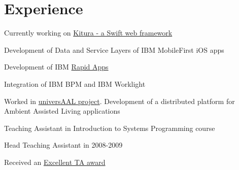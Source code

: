 \documentclass[]{deedy-resume}
\begin{document}
\hfill
\begin{minipage}[t]{0.66\textwidth}


\section{Experience}

\vspace{\topsep} %
\begin{tightemize}
\item Currently working on \href{https://github.com/IBM-Swift/Kitura}{Kitura - a Swift web framework}
\item Development of Data and Service Layers of IBM MobileFirst iOS apps
\item Development of IBM \href{https://www.youtube.com/watch?v=wKHfEx988mc}{Rapid Apps}
\item Integration of IBM BPM and IBM Worklight
\end{tightemize}
\sectionsep

\vspace{\topsep} %
\begin{tightemize}
\item Worked in \href{http://universaal.sintef9013.com/index.php/en/}{universAAL project}. Development of a distributed platform for Ambient Assisted Living applications
\end{tightemize}
\sectionsep

\vspace{\topsep} %
\begin{tightemize}
\item Teaching Assistant in Introduction to Systems Programming course
\item Head Teaching Assistant in 2008-2009
\item Received an \href{http://www.cs.technion.ac.il/news/2010/384/}{Excellent TA award}
\end{tightemize}
\sectionsep


\end{minipage}
\end{document}
